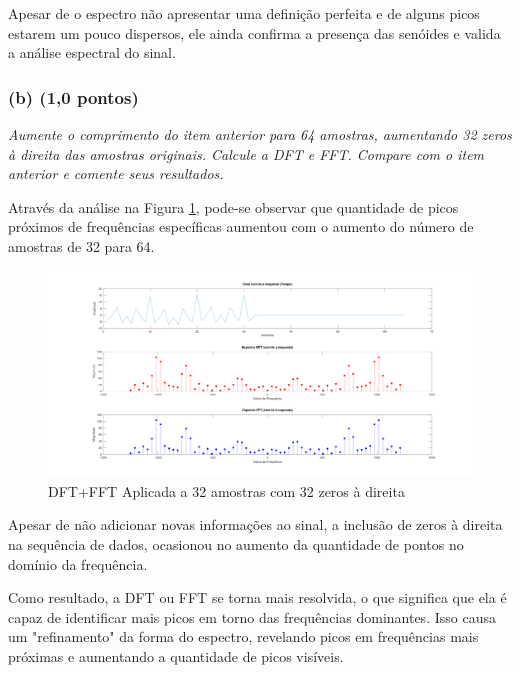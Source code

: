 Apesar de o espectro não apresentar uma definição perfeita e de alguns picos estarem um pouco dispersos, ele ainda confirma a presença das senóides e valida a análise espectral do sinal.

\subsubsection*{(b) \textbf{(1,0 pontos)}}
\textit{Aumente o comprimento do item anterior para 64 amostras, aumentando 32 zeros à direita das amostras originais. Calcule a DFT e FFT. Compare com o item anterior e comente seus resultados.}

Através da análise na Figura \ref{fig:signal_32samples_fft-dft_padded}, pode-se observar que quantidade de picos próximos de frequências específicas aumentou com o aumento do número de amostras de 32 para 64.

\begin{figure}[H]
    \centering
    \includegraphics[width=1\linewidth]{03_experimental_analysis//assets/plot_results/32_samples_dft_fft_padded.png}
    \caption{DFT+FFT Aplicada a 32 amostras com 32 zeros à direita}
    \label{fig:signal_32samples_fft-dft_padded}
\end{figure}

Apesar de não adicionar novas informações ao sinal, a inclusão de zeros à direita na sequência de dados, ocasionou no aumento da quantidade de pontos no domínio da frequência.

Como resultado, a DFT ou FFT se torna mais resolvida, o que significa que ela é capaz de identificar mais picos em torno das frequências dominantes. Isso causa um "refinamento" da forma do espectro, revelando picos em frequências mais próximas e aumentando a quantidade de picos visíveis.

